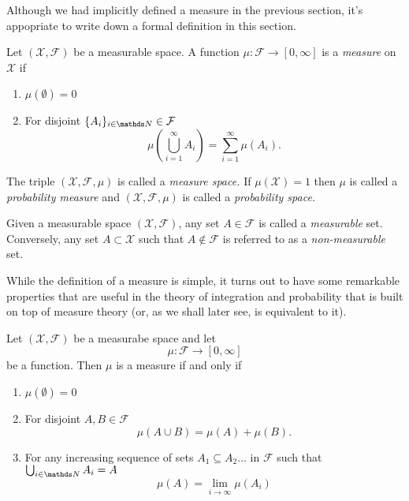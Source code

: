 Although we had implicitly defined a measure in the previous section,
it's appopriate to write down a formal definition in this section.
\begin{defn}
\label{def:measureSpace}Let $\left(\mathcal{X},\mathcal{F}\right)$
be a measurable space. A function $\mu:\mathcal{F}\longrightarrow\left[0,\infty\right]$
is a \emph{measure }on $\mathcal{X}$ if

\begin{enumerate}[label=(\roman*),leftmargin=.1\linewidth,rightmargin=.4\linewidth]
	\item $\mu\left(\emptyset\right)= 0$
	\item For disjoint $\{A_i\}_{i\in \N} \in \mathcal{F}$ 
	\[
			\mu\left(\bigcup_{i=1}^{\infty}A_i\right) = \sum_{i=1}^{\infty}\mu\left(A_i\right).
	\]
\end{enumerate}The triple $\left(\mathcal{X},\mathcal{F},\mu\right)$ is called a
\emph{measure space. }If $\mu\left(\mathcal{X}\right)=1$ then $\mu$
is called a \emph{probability measure }and $\left(\mathcal{X},\mathcal{F},\mu\right)$
is called a \emph{probability space.}
\end{defn}

\begin{defn}
\label{def:measurableSet}Given a measurable space $\left(\mathcal{X},\mathcal{F}\right)$,
any set $A\in\mathcal{F}$ is called a \emph{measurable }set. Conversely,
any set $A\subset\mathcal{X}$ such that $A\notin\mathcal{F}$ is
referred to as a \emph{non-measurable }set.
\end{defn}

While the definition of a measure is simple, it turns out to have
some remarkable properties that are useful in the theory of integration
and probability that is built on top of measure theory (or, as we
shall later see, is equivalent to it).
\begin{prop}
\label{prop:measureProperties}Let $\left(\mathcal{X},\mathcal{F}\right)$
be a measurabe space and let 
\[
\mu:\mathcal{F}\longrightarrow\left[0,\infty\right]
\]
be a function. Then $\mu$ is a measure if and only if

\begin{enumerate}[label=(\roman*),leftmargin=.1\linewidth,rightmargin=.4\linewidth]
	\item $\mu\left(\emptyset\right)= 0$
	\item For disjoint $A,B \in \mathcal{F}$ 
	\[
			\mu\left(A \cup B\right) = \mu\left(A\right) + \mu\left(B\right) .
	\]
	\item For any increasing sequence of sets $ A_1 \subseteq A_2 \ldots $ in $\mathcal{F}$ such that $\bigcup_{i\in\N} A_i = A $
	\[
			\mu\left(A\right) = \lim_{i \to \infty}\mu\left(A_i\right)
	\]
\end{enumerate}
\end{prop}

